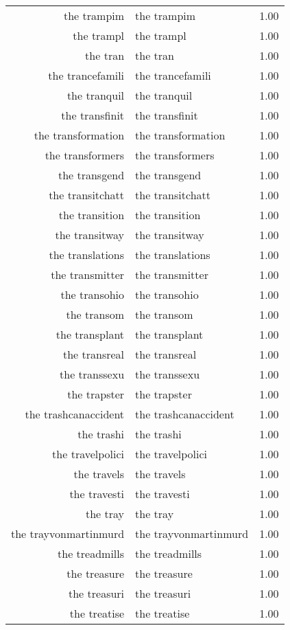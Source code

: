 \begin{table}[ht]
\begin{tabular}{rlr}
  the trampim & the trampim & 1.00 \\ 
  the trampl & the trampl & 1.00 \\ 
  the tran & the tran & 1.00 \\ 
  the trancefamili & the trancefamili & 1.00 \\ 
  the tranquil & the tranquil & 1.00 \\ 
  the transfinit & the transfinit & 1.00 \\ 
  the transformation & the transformation & 1.00 \\ 
  the transformers & the transformers & 1.00 \\ 
  the transgend & the transgend & 1.00 \\ 
  the transitchatt & the transitchatt & 1.00 \\ 
  the transition & the transition & 1.00 \\ 
  the transitway & the transitway & 1.00 \\ 
  the translations & the translations & 1.00 \\ 
  the transmitter & the transmitter & 1.00 \\ 
  the transohio & the transohio & 1.00 \\ 
  the transom & the transom & 1.00 \\ 
  the transplant & the transplant & 1.00 \\ 
  the transreal & the transreal & 1.00 \\ 
  the transsexu & the transsexu & 1.00 \\ 
  the trapster & the trapster & 1.00 \\ 
  the trashcanaccident & the trashcanaccident & 1.00 \\ 
  the trashi & the trashi & 1.00 \\ 
  the travelpolici & the travelpolici & 1.00 \\ 
  the travels & the travels & 1.00 \\ 
  the travesti & the travesti & 1.00 \\ 
  the tray & the tray & 1.00 \\ 
  the trayvonmartinmurd & the trayvonmartinmurd & 1.00 \\ 
  the treadmills & the treadmills & 1.00 \\ 
  the treasure & the treasure & 1.00 \\ 
  the treasuri & the treasuri & 1.00 \\ 
  the treatise & the treatise & 1.00 \\ 

\end{tabular}
\end{table}
